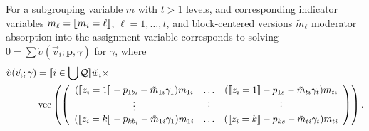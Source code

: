 \documentclass{article}
\DeclarePairedDelimiter{\indicator}{\llbracket}{\rrbracket}
\newcommand{\owt}[1][{[z_{i}]}]{\ensuremath{\check{w}_{i#1}}}
\newcommand{\absorbModeratorEF}{\grave{\upsilon}}
\begin{document}
For a subgrouping variable $m$ with $t>1$ levels, and corresponding
indicator variables $m_{\ell} =\indicator{m_{i}=\ell}$, $\ell=1,
\ldots, t$, and block-centered versions $\tilde{m}_{\ell}$  moderator absorption into the assignment variable
corresponds to solving $0 = \sum
\absorbModeratorEF(\vec{v}_{i}; \mathbf{p}, {\gamma})$ for $\gamma$, where
\begin{align}
    \absorbModeratorEF(\vec{v}_{i}; \mathbf{\gamma})
&=
                                                 \indicator{i \in \bigcup \mathcal{Q}} \owt[] \times \nonumber \\
  &\operatorname{vec}  \left(%
                                                 \left(
                                                 \begin{array}{ccc}
                                                   (\indicator{z_{i}=1}-p_{1b_{i}}-\tilde{m}_{1i}\gamma_{1})m_{1i}&\ldots&(\indicator{z_{i}=1}-p_{1s}-\tilde{m}_{ti}\gamma_{t})m_{ti}
                                                   \\
                                                   \vdots & \vdots &
                                                                     \vdots
                                                   \\
                                                   (\indicator{z_{i}=k}-p_{kb_{i}}
                                                   - \tilde{m}_{1i}\gamma_{1})m_{1i}&\ldots&(\indicator{z_{i}=k}-p_{ks}-\tilde{m}_{ti}\gamma_{t})m_{ti}\\                                                 \end{array}
  \right)%
  \right) .  \label{eq:17}
\end{align}
\end{document}

